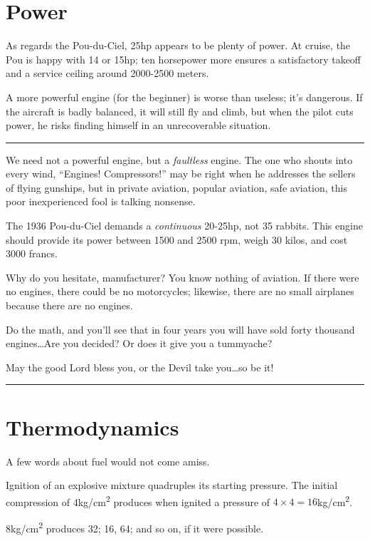 \documentclass{book}
\newcommand*\sectline{
  \vspace{5pt}
  \begin{center}
    \rule{0.5\linewidth}{\linethickness}
  \end{center}
  \vspace{5pt}
}
\begin{document}
\section{Power}

As regards the Pou-du-Ciel, 25hp appears to be plenty of power.  At
cruise, the Pou is happy with 14 or 15hp; ten horsepower more ensures
a satisfactory takeoff and a service ceiling around 2000-2500 meters.

A more powerful engine (for the beginner) is worse than useless; it's
dangerous.  If the aircraft is badly balanced, it will still fly and
climb, but when the pilot cuts power, he risks finding himself in an
unrecoverable situation.

\sectline

We need not a powerful engine, but a \textit{faultless} engine.  The
one who shouts into every wind, ``Engines!  Compressors!'' may be
right when he addresses the sellers of flying gunships, but in private
aviation, popular aviation, safe aviation, this poor inexperienced
fool is talking nonsense.

The 1936 Pou-du-Ciel demands a \textit{continuous} 20-25hp, not 35
rabbits.  This engine should provide its power between 1500 and 2500
rpm, weigh 30 kilos, and cost 3000 francs.

Why do you hesitate, manufacturer?  You know nothing of aviation.  If
there were no engines, there could be no motorcycles; likewise, there
are no small airplanes because there are no engines.

Do the math, and you'll see that in four years you will have sold
forty thousand engines\ldots Are you decided?  Or does it give you a
tummyache?

May the good Lord bless you, or the Devil take you\ldots so be it!

\sectline

\section{Thermodynamics}

A few words about fuel would not come amiss.

Ignition of an explosive mixture quadruples its starting pressure.
The initial compression of 4kg/cm\textsuperscript{2} produces when
ignited a pressure of $4\times4 = 16$kg/cm\textsuperscript{2}.

8kg/cm\textsuperscript{2} produces 32; 16, 64; and so on, if it were
possible.
\end{document}
